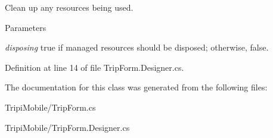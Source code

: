 Clean up any resources being used. 
\begin{DoxyParams}{Parameters}
\item[{\em disposing}]true if managed resources should be disposed; otherwise, false.\end{DoxyParams}


Definition at line 14 of file TripForm.Designer.cs.

The documentation for this class was generated from the following files:\begin{DoxyCompactItemize}
\item 
TripiMobile/TripForm.cs\item 
TripiMobile/TripForm.Designer.cs\end{DoxyCompactItemize}

